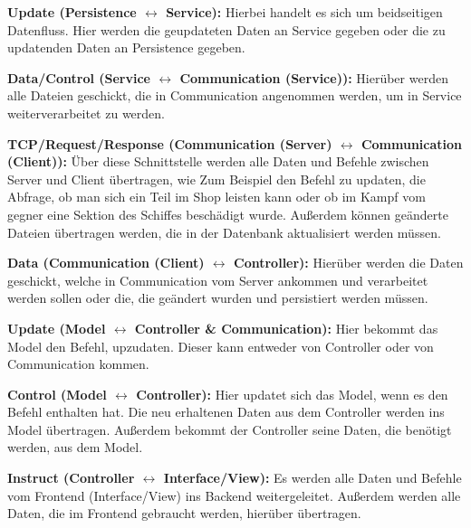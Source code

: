 \documentclass[fontsize=12pt,paper=a4,twoside]{scrartcl}
\begin{document}
\textbf{Update (Persistence $\leftrightarrow$ Service):}
Hierbei handelt es sich um beidseitigen Datenfluss. Hier werden die geupdateten Daten an Service gegeben oder die zu updatenden Daten an Persistence gegeben. 

\textbf{Data/Control (Service $\leftrightarrow$ Communication (Service)):}
Hierüber werden alle Dateien geschickt, die in Communication angenommen werden, um in Service weiterverarbeitet zu werden. 

\textbf{TCP/Request/Response (Communication (Server) $\leftrightarrow$ Communication (Client)):}
Über diese Schnittstelle werden alle Daten und Befehle zwischen Server und Client übertragen, wie Zum Beispiel den Befehl zu updaten, die Abfrage, ob man sich ein Teil im Shop leisten kann oder ob im Kampf vom gegner eine Sektion des Schiffes beschädigt wurde. Außerdem können geänderte Dateien übertragen werden, die in der Datenbank aktualisiert werden müssen. 

\textbf{Data (Communication (Client) $\leftrightarrow$ Controller):}
Hierüber werden die Daten geschickt, welche in Communication vom Server ankommen und verarbeitet werden sollen oder die, die geändert wurden und persistiert werden müssen. 

\textbf{Update (Model $\leftrightarrow$ Controller \& Communication):}
Hier bekommt das Model den Befehl, upzudaten. Dieser kann entweder von Controller oder von Communication kommen. 

\textbf{Control (Model $\leftrightarrow$ Controller):}
Hier updatet sich das Model, wenn es den Befehl enthalten hat. Die neu erhaltenen Daten aus dem Controller werden ins Model übertragen. Außerdem bekommt der Controller seine Daten, die benötigt werden, aus dem Model. 

\textbf{Instruct (Controller $\leftrightarrow$ Interface/View):}
Es werden alle Daten und Befehle vom Frontend (Interface/View) ins Backend weitergeleitet. Außerdem werden alle Daten, die im Frontend gebraucht werden, hierüber übertragen.
\end{document}
